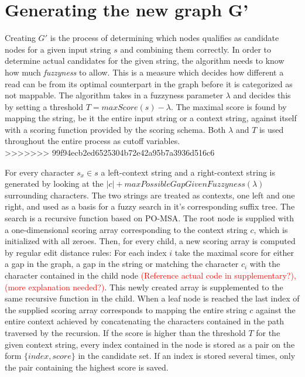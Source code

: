 \documentclass{article}
\begin{document}
\section{Generating the new graph G'}
Creating $G'$ is the process of determining which nodes qualifies as candidate nodes for a given input string $s$ and combining them correctly. In order to determine actual candidates for the given string, the algorithm needs to know how much \textit{fuzzyness} to allow. This is a measure which decides how different a read can be from its optimal counterpart in the graph before it is categorized as not mappable. The algorithm takes in a fuzzyness parameter $\lambda$ and decides this by setting a threshold $T=maxScore(s)-\lambda$. The maximal score is found by mapping the string, be it the entire input string or a context string, against itself with a scoring function provided by the scoring schema. Both $\lambda$ and $T$ is used throughout the entire process as cutoff variables.\\
>>>>>>> 99f94ecb2ed6525304b72e42a95b7a3936d516c6
\par\noindent
For every character $s_x \in s$ a left-context string and a right-context string is generated by looking at the $|c| + maxPossibleGapGivenFuzzyness(\lambda)$ surrounding characters. The two strings are treated as contexts, one left and one right, and used as a basis for a fuzzy search in it's corresponding suffix tree. The search is a recursive function based on PO-MSA. The root node is supplied with a one-dimensional scoring array corresponding to the context string $c$, which is initialized with all zeroes. Then, for every child, a new scoring array is computed by regular edit distance rules: For each index $i$ take the maximal score for either a gap in the graph, a gap in the string or matching the character $c_i$ with the character contained in the child node \textcolor{red}{(Reference actual code in supplementary?), (more explanation needed?)}. This newly created array is supplemented to the same recursive function in the child. When a leaf node is reached the last index of the supplied scoring array corresponds to mapping the entire string $c$ against the entire context achieved by concatenating the characters contained in the path traversed by the recursion. If the score is higher than the threshold $T$ for the given context string, every index contained in the node is stored as a pair on the form $\{index, score\}$ in the candidate set. If an index is stored several times, only the pair containing the highest score is saved.\\
\end{document}
